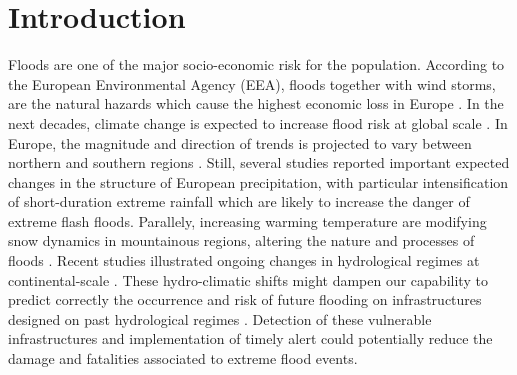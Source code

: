 \chapter{Introduction}
\label{chp:introduction}

\newcommand{\keyword}[1]{\textbf{#1}}
\newcommand{\tabhead}[1]{\textbf{#1}}
\newcommand{\code}[1]{\texttt{#1}}
\newcommand{\file}[1]{\texttt{\bfseries#1}}
\newcommand{\option}[1]{\texttt{\itshape#1}}

Floods are one of the major socio-economic risk for the population. According to the European Environmental Agency (EEA), floods together with wind storms, are the natural hazards which cause the highest economic loss  
in Europe \autocite{european_environment_agency_flood_2013}.
In the next decades, climate change is expected to increase flood risk at global scale \autocite{milly_increasing_2002,hirabayashi_global_2008,hirabayashi_global_2013}. In Europe, the magnitude and direction of trends is projected to vary between northern and southern regions \autocite{dankers_flood_2009,alfieri_global_2015, thober_multi-model_2018}. Still, several studies reported important expected changes in the structure of European precipitation, with particular intensification of short-duration extreme rainfall \autocite{christensen_intensification_2004,zolina_changing_2010,westra_global_2013} which are likely to increase the danger of extreme flash floods. 
Parallely, increasing warming temperature are modifying snow dynamics in mountainous regions, altering the nature and processes of floods \autocite{koplin_seasonality_2014,hall_understanding_2014}. 
Recent studies illustrated ongoing changes in hydrological regimes at continental-scale \autocite{bloschl_changing_2017}.
These hydro-climatic shifts might dampen our capability to predict correctly the occurrence and risk of future flooding on infrastructures designed on past hydrological regimes \autocite{milly_increasing_2002}.
Detection of these vulnerable infrastructures and implementation of timely alert could potentially reduce the damage and fatalities associated to extreme flood events.\\
 
